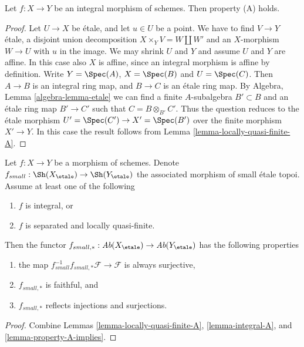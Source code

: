 \begin{lemma}
\label{lemma-integral-A}
Let $f : X \to Y$ be an integral morphism of schemes.
Then property (A) holds.
\end{lemma}

\begin{proof}
Let $U \to X$ be \'etale, and let $u \in U$ be a point.
We have to find $V \to Y$ \'etale, a disjoint union decomposition
$X \times_Y V = W \amalg W'$ and an $X$-morphism $W \to U$
with $u$ in the image. We may shrink $U$ and $Y$ and assume
$U$ and $Y$ are affine. In this case also $X$ is affine, since
an integral morphism is affine by definition. Write $Y = \Spec(A)$,
$X = \Spec(B)$ and $U = \Spec(C)$. Then $A \to B$ is an
integral ring map, and $B \to C$ is an \'etale ring map. By
Algebra, Lemma \ref{algebra-lemma-etale}
we can find a finite $A$-subalgebra $B' \subset B$ and an \'etale ring
map $B' \to C'$ such that $C = B \otimes_{B'} C'$. Thus the question
reduces to the \'etale morphism
$U' = \Spec(C') \to X' = \Spec(B')$
over the finite morphism $X' \to Y$. In this case the result follows from
Lemma \ref{lemma-locally-quasi-finite-A}.
\end{proof}

\begin{lemma}
\label{lemma-when-push-pull-surjective}
Let $f : X \to Y$ be a morphism of schemes. Denote
$f_{small} :
\Sh(X_\etale)
\to
\Sh(Y_\etale)$
the associated morphism of small \'etale topoi. Assume at least one
of the following
\begin{enumerate}
\item $f$ is integral, or
\item $f$ is separated and locally quasi-finite.
\end{enumerate}
Then the functor
$f_{small, *} :
\textit{Ab}(X_\etale)
\to
\textit{Ab}(Y_\etale)$
has the following properties
\begin{enumerate}
\item the map
$f_{small}^{-1}f_{small, *}\mathcal{F} \to \mathcal{F}$
is always surjective,
\item $f_{small, *}$ is faithful, and
\item $f_{small, *}$ reflects injections and surjections.
\end{enumerate}
\end{lemma}

\begin{proof}
Combine
Lemmas \ref{lemma-locally-quasi-finite-A},
\ref{lemma-integral-A}, and
\ref{lemma-property-A-implies}.
\end{proof}



